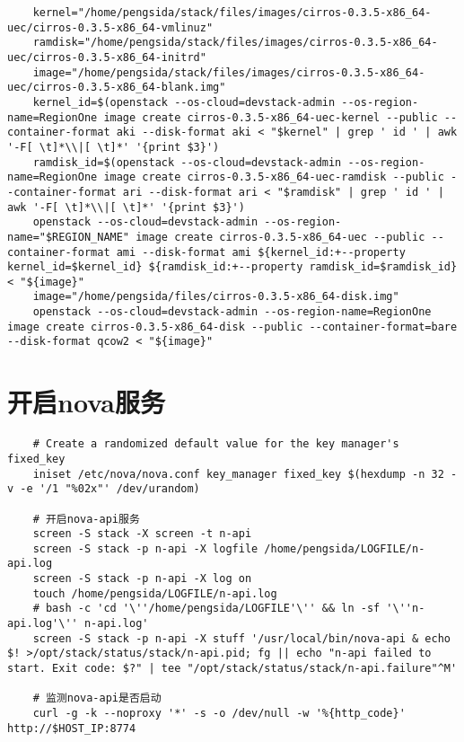 \documentclass[a4paper,left=1.5cm,right=1.5cm,11pt]{article}
\begin{document}
\begin{lstlisting}
	kernel="/home/pengsida/stack/files/images/cirros-0.3.5-x86_64-uec/cirros-0.3.5-x86_64-vmlinuz"
	ramdisk="/home/pengsida/stack/files/images/cirros-0.3.5-x86_64-uec/cirros-0.3.5-x86_64-initrd"
	image="/home/pengsida/stack/files/images/cirros-0.3.5-x86_64-uec/cirros-0.3.5-x86_64-blank.img"
	kernel_id=$(openstack --os-cloud=devstack-admin --os-region-name=RegionOne image create cirros-0.3.5-x86_64-uec-kernel --public --container-format aki --disk-format aki < "$kernel" | grep ' id ' | awk '-F[ \t]*\\|[ \t]*' '{print $3}')
	ramdisk_id=$(openstack --os-cloud=devstack-admin --os-region-name=RegionOne image create cirros-0.3.5-x86_64-uec-ramdisk --public --container-format ari --disk-format ari < "$ramdisk" | grep ' id ' | awk '-F[ \t]*\\|[ \t]*' '{print $3}')
	openstack --os-cloud=devstack-admin --os-region-name="$REGION_NAME" image create cirros-0.3.5-x86_64-uec --public --container-format ami --disk-format ami ${kernel_id:+--property kernel_id=$kernel_id} ${ramdisk_id:+--property ramdisk_id=$ramdisk_id} < "${image}"
	image="/home/pengsida/files/cirros-0.3.5-x86_64-disk.img"
	openstack --os-cloud=devstack-admin --os-region-name=RegionOne image create cirros-0.3.5-x86_64-disk --public --container-format=bare --disk-format qcow2 < "${image}"
	\end{lstlisting}

\section{开启nova服务}
	\begin{lstlisting}
	# Create a randomized default value for the key manager's fixed_key
	iniset /etc/nova/nova.conf key_manager fixed_key $(hexdump -n 32 -v -e '/1 "%02x"' /dev/urandom)

	# 开启nova-api服务
	screen -S stack -X screen -t n-api
	screen -S stack -p n-api -X logfile /home/pengsida/LOGFILE/n-api.log
    screen -S stack -p n-api -X log on
	touch /home/pengsida/LOGFILE/n-api.log
    # bash -c 'cd '\''/home/pengsida/LOGFILE'\'' && ln -sf '\''n-api.log'\'' n-api.log'
	screen -S stack -p n-api -X stuff '/usr/local/bin/nova-api & echo $! >/opt/stack/status/stack/n-api.pid; fg || echo "n-api failed to start. Exit code: $?" | tee "/opt/stack/status/stack/n-api.failure"^M'

	# 监测nova-api是否启动
	curl -g -k --noproxy '*' -s -o /dev/null -w '%{http_code}' http://$HOST_IP:8774
	\end{lstlisting}
\end{document}
